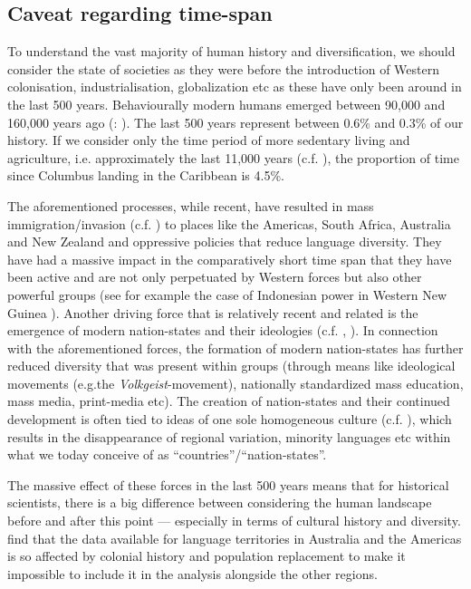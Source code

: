 \documentclass[unnumsec,webpdf,modern,medium]{oup-authoring-template}
\begin{document}
\begin{appendices}
\section{Caveat regarding time-span}
\label{appendix_time_span}

To understand the vast majority of human history and diversification, we should consider the state of societies as they were before the introduction of Western colonisation, industrialisation, globalization etc as these have only been around in the last 500 years. Behaviourally modern humans emerged between 90,000 and 160,000 years ago (\citet{powell2009late}: \cite{marean2007early}). The last 500 years represent between 0.6\% and 0.3\% of our history. If we consider only the time period of more sedentary living and agriculture, i.e. approximately the last 11,000 years (c.f. \citet{kislev2006early}), the proportion of time since Columbus landing in the Caribbean is 4.5\%.

The aforementioned processes, while recent, have resulted in mass immigration/invasion (c.f. \citet{invasion_day}) to places like the Americas, South Africa, Australia and New Zealand and oppressive policies that reduce language diversity. They have had a massive impact in the comparatively short time span that they have been active and are not only perpetuated by Western forces but also other powerful groups (see for example the case of Indonesian power in Western New Guinea \citep{gietzelt1989indonesianization}). Another driving force that is relatively recent and related is the emergence of modern nation-states and their ideologies (c.f. \citet{foucault2007security}, \citet[21-22]{oakes2001language}). In connection with the aforementioned forces, the formation of modern nation-states has further reduced diversity that was present within groups (through means like ideological movements (e.g.the \emph{Volkgeist}-movement), nationally standardized mass education, mass media, print-media etc). The creation of nation-states and their continued development is often tied to ideas of one sole homogeneous culture (c.f. \citet{encyclo_nationalism}), which results in the disappearance of regional variation, minority languages etc within what we today conceive of as ``countries''/``nation-states''. 

The massive effect of these forces in the last 500 years means that for historical scientists, there is a big difference between considering the human landscape before and after this point --- especially in terms of cultural history and diversity. \citet[7340-7341]{curriemace2009} find that the data available for language territories in Australia and the Americas is so affected by colonial history and population replacement to make it impossible to include it in the analysis alongside the other regions. 


\end{appendices}
\end{document}
